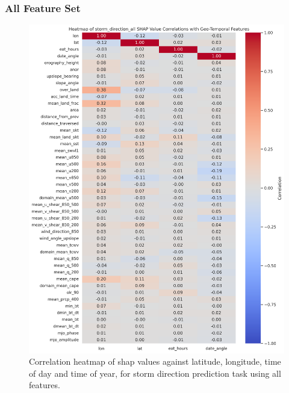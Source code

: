 \subsubsection{All Feature Set}
\begin{figure}[ht]
    \centering
    \includegraphics[width=\textwidth]{../figures/generated/experiments/storm_direction/storm_direction_all_shap_correlation_heatmap.png}
    \caption{Correlation heatmap of \acrshort{shap} values against latitude, longitude, time of day and time of year, for storm direction prediction task using all features.}
    \label{fig:storm_direction_all_shap_heatmap}
\end{figure}

